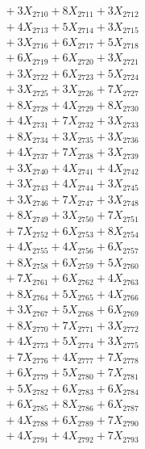 \documentclass[a4paper,10pt]{article}
\begin{document}
{\begin{align}
&\;  + 3 X_{2710} + 8 X_{2711} + 3 X_{2712} \\[0.3ex]
&\;  + 4 X_{2713} + 5 X_{2714} + 3 X_{2715} \\[0.3ex]
&\;  + 3 X_{2716} + 6 X_{2717} + 5 X_{2718} \\[0.3ex]
&\;  + 6 X_{2719} + 6 X_{2720} + 3 X_{2721} \\[0.3ex]
&\;  + 3 X_{2722} + 6 X_{2723} + 5 X_{2724} \\[0.3ex]
&\;  + 3 X_{2725} + 3 X_{2726} + 7 X_{2727} \\[0.3ex]
&\;  + 8 X_{2728} + 4 X_{2729} + 8 X_{2730} \\[0.3ex]
&\;  + 4 X_{2731} + 7 X_{2732} + 3 X_{2733} \\[0.3ex]
&\;  + 8 X_{2734} + 3 X_{2735} + 3 X_{2736} \\[0.3ex]
&\;  + 4 X_{2737} + 7 X_{2738} + 3 X_{2739} \\[0.5ex]\allowbreak
&\;  + 3 X_{2740} + 4 X_{2741} + 4 X_{2742} \\[0.3ex]
&\;  + 3 X_{2743} + 4 X_{2744} + 3 X_{2745} \\[0.3ex]
&\;  + 3 X_{2746} + 7 X_{2747} + 3 X_{2748} \\[0.3ex]
&\;  + 8 X_{2749} + 3 X_{2750} + 7 X_{2751} \\[0.3ex]
&\;  + 7 X_{2752} + 6 X_{2753} + 8 X_{2754} \\[0.3ex]
&\;  + 4 X_{2755} + 4 X_{2756} + 6 X_{2757} \\[0.3ex]
&\;  + 8 X_{2758} + 6 X_{2759} + 5 X_{2760} \\[0.3ex]
&\;  + 7 X_{2761} + 6 X_{2762} + 4 X_{2763} \\[0.3ex]
&\;  + 8 X_{2764} + 5 X_{2765} + 4 X_{2766} \\[0.3ex]
&\;  + 3 X_{2767} + 5 X_{2768} + 6 X_{2769} \\[0.5ex]\allowbreak
&\;  + 8 X_{2770} + 7 X_{2771} + 3 X_{2772} \\[0.3ex]
&\;  + 4 X_{2773} + 5 X_{2774} + 3 X_{2775} \\[0.3ex]
&\;  + 7 X_{2776} + 4 X_{2777} + 7 X_{2778} \\[0.3ex]
&\;  + 6 X_{2779} + 5 X_{2780} + 7 X_{2781} \\[0.3ex]
&\;  + 5 X_{2782} + 6 X_{2783} + 6 X_{2784} \\[0.3ex]
&\;  + 6 X_{2785} + 8 X_{2786} + 6 X_{2787} \\[0.3ex]
&\;  + 4 X_{2788} + 6 X_{2789} + 7 X_{2790} \\[0.3ex]
&\;  + 4 X_{2791} + 4 X_{2792} + 7 X_{2793} \\[0.3ex]

\end{align}}
\end{document}
